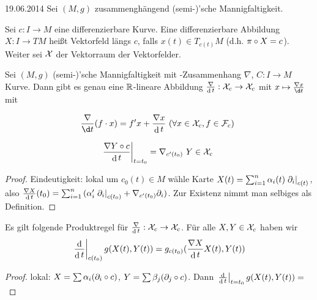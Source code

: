\documentclass{article}
\begin{document}
\hfill{19.06.2014}
Sei $(M,g)$ zusammenghängend (semi-)'sche Mannigfaltigkeit.

\begin{definition}
    Sei $c:I\to M$ eine differenzierbare Kurve. Eine differenzierbare Abbildung $X:I\to TM$ heißt Vektorfeld längs $c$, falls $x(t)\in T_{c(t)}M$ (d.h. $\pi\circ X=c$).
    Weiter sei $\mathcal{X}$ der Vektorraum der Vektorfelder.
\end{definition}

\begin{theorem}
    Sei $(M,g)$ (semi-)'sche Mannigfaltigkeit mit -Zusammenhang $\nabla$, $C:I\to M$ Kurve. Dann gibt es genau eine $\mathbb{R}$-lineare Abbildung $\frac\nabla{\mathop\mathrm{d} t}:\mathcal{X}_c\rightarrow\mathcal{X}_c$ mit $x\mapsto \frac{\nabla x}{\d t}$ mit
    \begin{properties}
            \item $$
        \frac{\nabla}{\d t}(f\cdot x)=f' x+\frac{\nabla x}{\diff t} \text{ ($\forall x\in\cX_c, f\in \cF_c$) }
        $$
            \item $$
        \left. \frac{\nabla Y\circ c}{\mathop\mathrm{d} t}\right\vert_{t=t_0} = \nabla_{c'(t_0)} \text{ $Y\in\mathcal{X}_c$ } 
        $$
    \end{properties}
\end{theorem}

\begin{proof}
    Eindeutigkeit: lokal um $c_0(t)\in M$ wähle Karte $X(t)=\sum_{i=1}^n{\alpha_i(t)\left. \partial_i\right\vert_{c(t)}}$, also $\frac{\nabla X}{\mathop\mathrm{d}{t}}(t_0)=\sum_{i=1}^n{(\alpha_i'\left. \partial_i\right\vert_{c(t_0)}+\nabla_{c'(t_0)}{\partial_i})}$. Zur Existenz nimmt man selbiges als Definition.
\end{proof}

\begin{lemma}
    Es gilt folgende Produktregel für $\frac{\nabla}{\mathop\mathrm{d}{t}}:\mathcal{X}_c\rightarrow\mathcal{X}_c$. Für alle $X,Y\in\mathcal{X}_c$ haben wir
    $$
    \left. \frac{\mathop\mathrm{d}}{\mathop\mathrm{d}{t}}\right\vert_{c(t_0)}{g(X(t),Y(t))}=g_{c(t_0)}(\frac{\nabla X}{\mathop\mathrm{d} t}X(t),Y(t))
    $$
\end{lemma}

\begin{proof}
    lokal: $X=\sum{\alpha_i(\partial_i\circ c)}$, $Y=\sum{\beta_j(\partial_j\circ c)}$.
        Dann $\left. \frac{\mathop\mathrm{d}}{\mathop\mathrm{d} t}\right\vert_{t=t_0}{g(X(t),Y(t))}=$
\end{proof}
\end{document}
